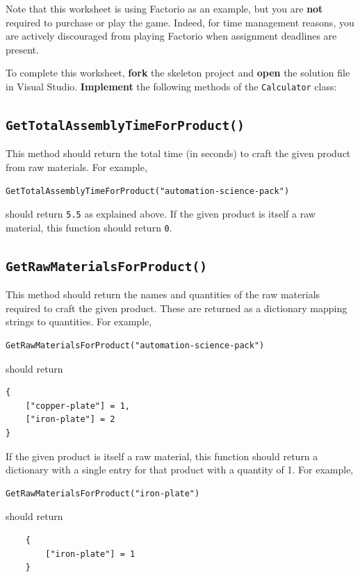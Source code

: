 \documentclass{../../../fal_assignment}
\begin{document}
Note that this worksheet is using Factorio as an example, but you are \textbf{not} required to purchase or play the game.
Indeed, for time management reasons, you are actively discouraged from playing Factorio when assignment deadlines are present.

To complete this worksheet, \textbf{fork} the skeleton project and \textbf{open} the solution file in Visual Studio.
\textbf{Implement} the following methods of the \lstinline{Calculator} class:

\subsection*{\lstinline{GetTotalAssemblyTimeForProduct()}}

This method should return the total time (in seconds) to craft the given product from raw materials.
For example,
\begin{lstlisting}
GetTotalAssemblyTimeForProduct("automation-science-pack")
\end{lstlisting}
should return \lstinline{5.5} as explained above. 
If the given product is itself a raw material, this function should return \lstinline{0}.

\subsection*{\lstinline{GetRawMaterialsForProduct()}}

This method should return the names and quantities of the raw materials required to craft the given product.
These are returned as a dictionary mapping strings to quantities.
For example,
\begin{lstlisting}
GetRawMaterialsForProduct("automation-science-pack")
\end{lstlisting}
should return
\begin{lstlisting}
{
	["copper-plate"] = 1,
	["iron-plate"] = 2
}
\end{lstlisting}

If the given product is itself a raw material, this function should return a dictionary with a single entry for that product with a quantity of 1.
For example,
\begin{lstlisting}
GetRawMaterialsForProduct("iron-plate")
\end{lstlisting}
should return
\begin{lstlisting}
	{
		["iron-plate"] = 1
	}
\end{lstlisting}
\end{document}
